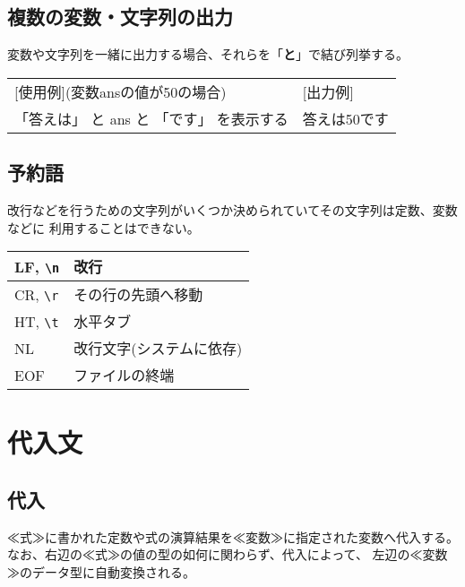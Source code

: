 \documentclass[11pt,a4j]{jarticle}
\begin{document}
\vspace{-6mm}
\subsection{複数の変数・文字列の出力}
変数や文字列を一緒に出力する場合、それらを「{\bf と}」で結び列挙する。

\begin{table}[!h]
\hspace{1cm}
\begin{tabular}{l l}
[使用例](変数ansの値が50の場合) & \hspace{2cm} [出力例] \\
\hspace{1cm} \noindent 「答えは」 と ans と 「です」 を表示する &
\hspace{3cm} \noindent 答えは50です\\
\end{tabular}
\end{table}

\vspace{-6mm}
\subsection{予約語}
改行などを行うための文字列がいくつか決められていてその文字列は定数、変数などに
利用することはできない。

\begin{table}[!h]
\begin{center}
{\small{
\begin{tabular}{|l|l|}
\hline
LF, \verb|\n| & 改行 \\
\hline
CR, \verb|\r| & その行の先頭へ移動 \\
\hline
HT, \verb|\t| & 水平タブ \\
\hline
NL     & 改行文字(システムに依存) \\
\hline
EOF    & ファイルの終端 \\
\hline
\end{tabular}
}}
\end{center}
\end{table}


\vspace{-5mm}
\section{代入文}
\subsection{代入}
\begin{quotation}
\end{quotation}
≪式≫に書かれた定数や式の演算結果を≪変数≫に指定された変数へ代入する。
なお、右辺の≪式≫の値の型の如何に関わらず、代入によって、
左辺の≪変数≫のデータ型に自動変換される。
\end{document}
